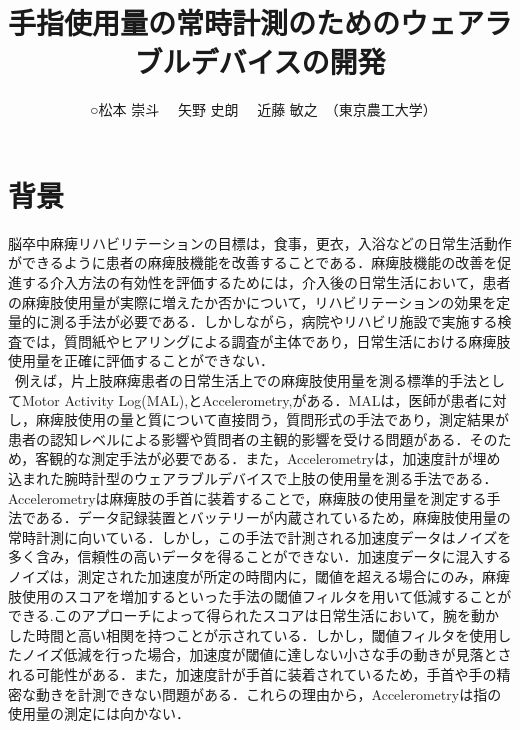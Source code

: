 \documentclass{jarticle}
\begin{document}
\title{手指使用量の常時計測のためのウェアラブルデバイスの開発}
\author{\ ○松本 崇斗 \ \ 矢野 史朗 \ \  近藤 敏之\ （東京農工大学）}



\maketitle\thispagestyle{empty}
\pagestyle{empty}

\section{背景}
脳卒中麻痺リハビリテーションの目標は，食事，更衣，入浴などの日常生活動作ができるように患者の麻痺肢機能を改善することである．麻痺肢機能の改善を促進する介入方法の有効性を評価するためには，介入後の日常生活において，患者の麻痺肢使用量が実際に増えたか否かについて，リハビリテーションの効果を定量的に測る手法が必要である．しかしながら，病院やリハビリ施設で実施する検査では，質問紙やヒアリングによる調査が主体であり，日常生活における麻痺肢使用量を正確に評価することができない．\\
\ 例えば，片上肢麻痺患者の日常生活上での麻痺肢使用量を測る標準的手法としてMotor Activity Log(MAL)\cite{Taub2006},\cite{Uswatte2005}とAccelerometry\cite{Chen2005},\cite{Hayward2016}がある．MALは，医師が患者に対し，麻痺肢使用の量と質について直接問う，質問形式の手法であり，測定結果が患者の認知レベルによる影響や質問者の主観的影響を受ける問題がある．そのため，客観的な測定手法が必要である．また，Accelerometryは，加速度計が埋め込まれた腕時計型のウェアラブルデバイスで上肢の使用量を測る手法である．Accelerometryは麻痺肢の手首に装着することで，麻痺肢の使用量を測定する手法である．データ記録装置とバッテリーが内蔵されているため，麻痺肢使用量の常時計測に向いている\cite{VanDerPas2011}．しかし，この手法で計測される加速度データはノイズを多く含み，信頼性の高いデータを得ることができない．加速度データに混入するノイズは，測定された加速度が所定の時間内に，閾値を超える場合にのみ，麻痺肢使用のスコアを増加するといった手法の閾値フィルタを用いて低減することができる.このアプローチによって得られたスコアは日常生活において，腕を動かした時間と高い相関を持つことが示されている．しかし，閾値フィルタを使用したノイズ低減を行った場合，加速度が閾値に達しない小さな手の動きが見落とされる可能性がある．また，加速度計が手首に装着されているため，手首や手の精密な動きを計測できない問題がある．これらの理由から，Accelerometryは指の使用量の測定には向かない\cite{Uswatte2000}．
\end{document}
